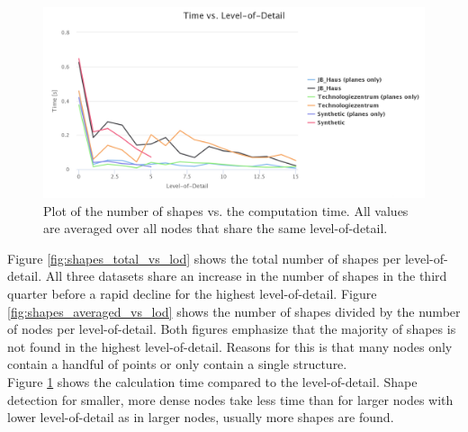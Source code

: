 \begin{figure}[h]
    \centering
    \includegraphics[width=1\textwidth]{Results/time_vs_lod.png}
    \caption[Plot of the number of shapes vs. the computation time]
		{Plot of the number of shapes vs. the computation time. All values are averaged over all nodes that share the same level-of-detail.}
    \label{fig:time_vs_lod}
\end{figure}


Figure \ref{fig:shapes_total_vs_lod} shows the total number of shapes per level-of-detail. All three datasets share an increase in the number of shapes in the third quarter before a rapid decline for the highest level-of-detail. Figure \ref{fig:shapes_averaged_vs_lod} shows the number of shapes divided by the number of nodes per level-of-detail. Both figures emphasize that the majority of shapes is not found in the highest level-of-detail. Reasons for this is that many nodes only contain a handful of points or only contain a single structure. 
\\

Figure \ref{fig:time_vs_lod} shows the calculation time compared to the level-of-detail. Shape detection for smaller, more dense nodes take less time than for larger nodes with lower level-of-detail as in larger nodes, usually more shapes are found. 


